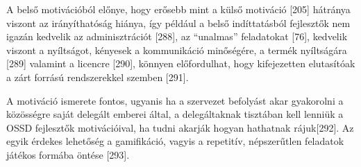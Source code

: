 \documentclass[12pt,magyar,a4paper,oneside]{scrreprt}
\begin{document}
A belső motivációból előnye, hogy erősebb mint a külső motiváció
{[}205{]} hátránya viszont az irányíthatóság hiánya, így például a belső
indíttatásból fejlesztők nem igazán kedvelik az adminisztrációt
{[}288{]}, az ``unalmas'' feladatokat {[}76{]}, kedvelik viszont a
nyíltságot, kényesek a kommunikáció minőségére, a termék nyíltságára
{[}289{]} valamint a licencre {[}290{]}, könnyen előfordulhat, hogy
kifejezetten elutasítóak a zárt forrású rendszerekkel szemben {[}291{]}.

A motiváció ismerete fontos, ugyanis ha a szervezet befolyást akar
gyakorolni a közösségre saját delegált emberei által, a delegáltaknak
tisztában kell lenniük a OSSD fejlesztők motivációival, ha tudni akarják
hogyan hathatnak rájuk{[}292{]}. Az egyik érdekes lehetőség a
gamifikáció, vagyis a repetitív, népszerűtlen feladatok játékos formába
öntése {[}293{]}.
\end{document}
